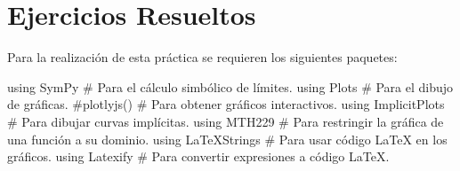 \documentclass[
  a4paper,
]{scrreport}
\newenvironment{Shaded}{\begin{snugshade}}{\end{snugshade}}
\newcommand{\BuiltInTok}[1]{\textcolor[rgb]{0.00,0.23,0.31}{#1}}
\newcommand{\CommentTok}[1]{\textcolor[rgb]{0.37,0.37,0.37}{#1}}
\newcommand{\ImportTok}[1]{\textcolor[rgb]{0.00,0.46,0.62}{#1}}
\theoremstyle{definition}
\theoremstyle{remark}
\begin{document}
\section{Ejercicios Resueltos}\label{ejercicios-resueltos-3}

Para la realización de esta práctica se requieren los siguientes
paquetes:

\begin{Shaded}
\begin{Highlighting}[]
\ImportTok{using} \BuiltInTok{SymPy}  \CommentTok{\# Para el cálculo simbólico de límites.}
\ImportTok{using} \BuiltInTok{Plots}  \CommentTok{\# Para el dibujo de gráficas.}
\CommentTok{\#plotlyjs() \# Para obtener gráficos interactivos.}
\ImportTok{using} \BuiltInTok{ImplicitPlots} \CommentTok{\# Para dibujar curvas implícitas.}
\ImportTok{using} \BuiltInTok{MTH229} \CommentTok{\# Para restringir la gráfica de una función a su dominio.}
\ImportTok{using} \BuiltInTok{LaTeXStrings}  \CommentTok{\# Para usar código LaTeX en los gráficos.}
\ImportTok{using} \BuiltInTok{Latexify}  \CommentTok{\# Para convertir expresiones a código LaTeX.}
\end{Highlighting}
\end{Shaded}
\end{document}
